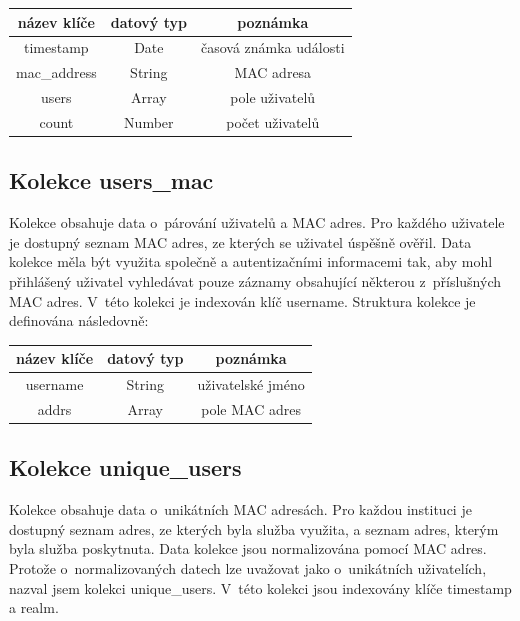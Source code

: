 \documentclass[thesis=M,czech]{FITthesis}[2012/06/26]
\begin{document}
      \begin{center}
        \begin{tabular}{ | c | c | c | }
          \hline
            název klíče   & datový typ & poznámka                 \\ \hline
            timestamp     & Date       & časová známka události   \\ \hline
            mac\_address  & String     & MAC adresa               \\ \hline
            users         & Array      & pole uživatelů           \\ \hline
            count         & Number     & počet uživatelů          \\
          \hline
        \end{tabular}
      \end{center}
    
    \subsection{Kolekce users\_mac}

      Kolekce obsahuje data o~párování uživatelů a MAC adres.
      Pro každého uživatele je dostupný seznam MAC adres, ze kterých se uživatel úspěšně ověřil.
      Data kolekce měla být využita společně a autentizačními informacemi tak,
      aby mohl přihlášený uživatel vyhledávat pouze záznamy obsahující některou z~příslušných MAC adres.
      V~této kolekci je indexován klíč username.
      Struktura kolekce je definována následovně:
      
      \begin{center}
        \begin{tabular}{ | c | c | c | }
          \hline
            název klíče   & datový typ & poznámka            \\ \hline
            username      & String     & uživatelské jméno   \\ \hline
            addrs         & Array      & pole MAC adres      \\
          \hline
        \end{tabular}
      \end{center}

    \subsection{Kolekce unique\_users}

      Kolekce obsahuje data o~unikátních MAC adresách.
      Pro každou instituci je dostupný seznam adres, 
      ze kterých byla služba využita, a seznam adres, kterým byla služba poskytnuta.
      Data kolekce jsou normalizována pomocí MAC adres.
      Protože o~normalizovaných datech lze uvažovat jako
      o~unikátních uživatelích, nazval jsem kolekci unique\_users.
      V~této kolekci jsou indexovány klíče timestamp a realm.
\end{document}
